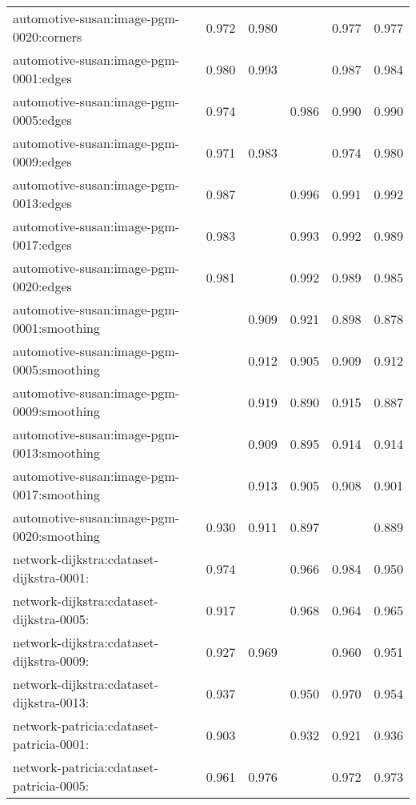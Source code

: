 \begin{longtable}{lrrrrr}
automotive-susan:image-pgm-0020:corners & 0.972 & 0.980 & \color{Green}{0.981} & 0.977 & 0.977 \\
automotive-susan:image-pgm-0001:edges & 0.980 & 0.993 & \color{Green}{0.994} & 0.987 & 0.984 \\
automotive-susan:image-pgm-0005:edges & 0.974 & \color{Green}{0.992} & 0.986 & 0.990 & 0.990 \\
automotive-susan:image-pgm-0009:edges & 0.971 & 0.983 & \color{Green}{0.986} & 0.974 & 0.980 \\
automotive-susan:image-pgm-0013:edges & 0.987 & \color{Green}{0.999} & 0.996 & 0.991 & 0.992 \\
automotive-susan:image-pgm-0017:edges & 0.983 & \color{Green}{0.994} & 0.993 & 0.992 & 0.989 \\
automotive-susan:image-pgm-0020:edges & 0.981 & \color{Green}{0.994} & 0.992 & 0.989 & 0.985 \\
automotive-susan:image-pgm-0001:smoothing & \color{Green}{0.928} & 0.909 & 0.921 & 0.898 & 0.878 \\
automotive-susan:image-pgm-0005:smoothing & \color{Green}{0.931} & 0.912 & 0.905 & 0.909 & 0.912 \\
automotive-susan:image-pgm-0009:smoothing & \color{Green}{0.932} & 0.919 & 0.890 & 0.915 & 0.887 \\
automotive-susan:image-pgm-0013:smoothing & \color{Green}{0.927} & 0.909 & 0.895 & 0.914 & 0.914 \\
automotive-susan:image-pgm-0017:smoothing & \color{Green}{0.929} & 0.913 & 0.905 & 0.908 & 0.901 \\
automotive-susan:image-pgm-0020:smoothing & 0.930 & 0.911 & 0.897 & \color{Green}{0.935} & 0.889 \\
network-dijkstra:cdataset-dijkstra-0001: & 0.974 & \color{Green}{0.989} & 0.966 & 0.984 & 0.950 \\
network-dijkstra:cdataset-dijkstra-0005: & 0.917 & \color{Green}{0.969} & 0.968 & 0.964 & 0.965 \\
network-dijkstra:cdataset-dijkstra-0009: & 0.927 & 0.969 & \color{Green}{0.971} & 0.960 & 0.951 \\
network-dijkstra:cdataset-dijkstra-0013: & 0.937 & \color{Green}{0.972} & 0.950 & 0.970 & 0.954 \\
network-patricia:cdataset-patricia-0001: & 0.903 & \color{Green}{0.943} & 0.932 & 0.921 & 0.936 \\
network-patricia:cdataset-patricia-0005: & 0.961 & 0.976 & \color{Green}{0.977} & 0.972 & 0.973 \\

\end{longtable}
